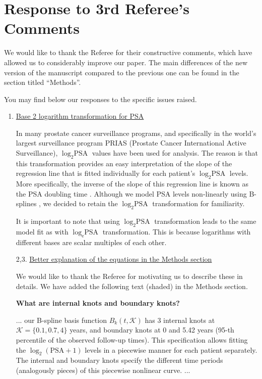 \clearpage
\section*{Response to 3rd Referee's Comments}
We would like to thank the Referee for their constructive comments, which have allowed us to considerably improve our paper. The main differences of the new version of the manuscript compared to the previous one can be found in the section titled ``Methods''.

You may find below our responses to the specific issues raised.

\begin{enumerate}
    \item \underline{Base 2 logarithm transformation for PSA}

    In many prostate cancer surveillance programs, and specifically in the world's largest surveillance program PRIAS (Prostate Cancer International Active Surveillance), $\log_2 \mbox{PSA}$ values have been used for analysis. The reason is that this transformation provides an easy interpretation of the slope of the regression line that is fitted individually for each patient's $\log_2 \mbox{PSA}$ levels. More specifically, the inverse of the slope of this regression line is known as the PSA doubling time \citep{ROBERTS2001576}. Although we model PSA levels non-linearly using B-splines \citep{de1978practical}, we decided to retain the $\log_2 \mbox{PSA}$ transformation for familiarity. 

    It is important to note that using $\log_2 \mbox{PSA}$ transformation leads to the same model fit as with $\log_{\mathrm{e}} \mbox{PSA}$ transformation. This is because logarithms with different bases are scalar multiples of each other.

    \item[2,3.] \underline{Better explanation of the equations in the Methods section}

    We would like to thank the Referee for motivating us to describe these in details. We have added the following text (shaded) in the Methods section.

    \textbf{What are internal knots and boundary knots?}
    \begin{shadequote}
    ... our B-spline basis function $B_k(t, \mathcal{K})$ has 3 internal knots at $\mathcal{K} = \{0.1, 0.7, 4\}$ years, and boundary knots at 0 and 5.42 years (95-th percentile of the observed follow-up times). This specification allows fitting the $\log_2 (\mbox{PSA} + 1)$ levels in a piecewise manner for each patient separately. The internal and boundary knots specify the different time periods (analogously pieces) of this piecewise nonlinear curve. ...
    \end{shadequote}


\end{enumerate}
